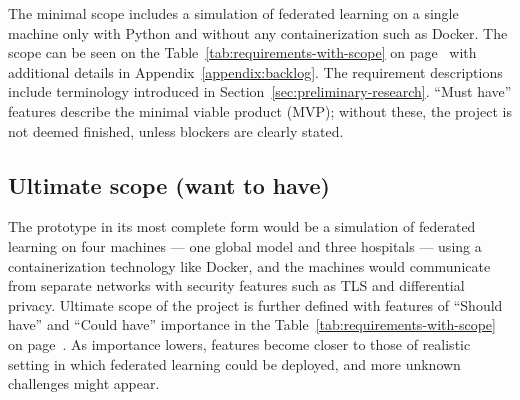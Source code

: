 The minimal scope includes a simulation of federated learning on a single machine only with Python and without any containerization such as Docker. The scope can be seen on the Table~\ref{tab:requirements-with-scope} on page~\pageref{tab:requirements-with-scope} with additional details in Appendix~\ref{appendix:backlog}. The requirement descriptions include terminology introduced in Section~\ref{sec:preliminary-research}. ``Must have'' features describe the minimal viable product (MVP); without these, the project is not deemed finished, unless blockers are clearly stated.

\subsection{Ultimate scope (want to have)}


The prototype in its most complete form would be a simulation of federated learning on four machines --- one global model and three hospitals --- using a containerization technology like Docker, and the machines would communicate from separate networks with security features such as TLS and differential privacy. Ultimate scope of the project is further defined with features of ``Should have'' and ``Could have'' importance in the Table~\ref{tab:requirements-with-scope} on page~\pageref{tab:requirements-with-scope}. As importance lowers, features become closer to those of realistic setting in which federated learning could be deployed, and more unknown challenges might appear.